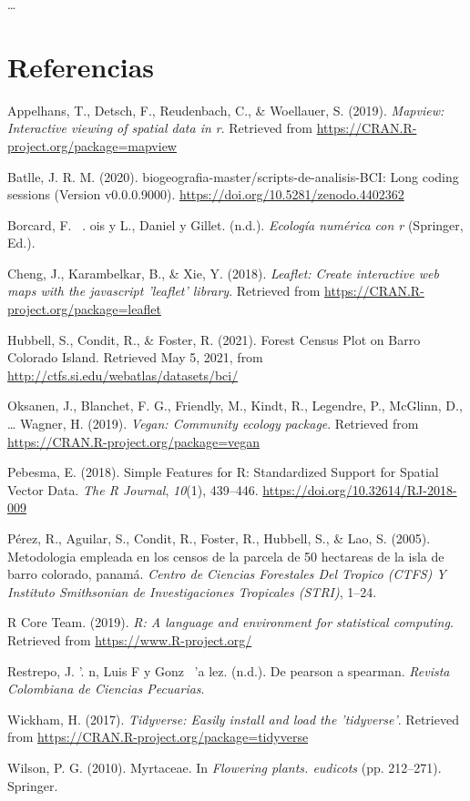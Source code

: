 \documentclass[11pt,]{article}
\begin{document}
\ldots

\section*{Referencias}\label{referencias}

\hypertarget{refs}{}
\hypertarget{ref-mapview}{}
Appelhans, T., Detsch, F., Reudenbach, C., \& Woellauer, S. (2019).
\emph{Mapview: Interactive viewing of spatial data in r}. Retrieved from
\url{https://CRAN.R-project.org/package=mapview}

\hypertarget{ref-jose_ramon_martinez_batlle_2020_4402362}{}
Batlle, J. R. M. (2020). biogeografia-master/scripts-de-analisis-BCI:
Long coding sessions (Version v0.0.0.9000).
\url{https://doi.org/10.5281/zenodo.4402362}

\hypertarget{ref-borcard2018numerical}{}
Borcard, F. ~. ois y L., Daniel y Gillet. (n.d.). \emph{Ecología
numérica con r} (Springer, Ed.).

\hypertarget{ref-leaflet}{}
Cheng, J., Karambelkar, B., \& Xie, Y. (2018). \emph{Leaflet: Create
interactive web maps with the javascript 'leaflet' library}. Retrieved
from \url{https://CRAN.R-project.org/package=leaflet}

\hypertarget{ref-webcenso}{}
Hubbell, S., Condit, R., \& Foster, R. (2021). Forest Census Plot on
Barro Colorado Island. Retrieved May 5, 2021, from
\url{http://ctfs.si.edu/webatlas/datasets/bci/}

\hypertarget{ref-vegan}{}
Oksanen, J., Blanchet, F. G., Friendly, M., Kindt, R., Legendre, P.,
McGlinn, D., \ldots{} Wagner, H. (2019). \emph{Vegan: Community ecology
package}. Retrieved from \url{https://CRAN.R-project.org/package=vegan}

\hypertarget{ref-sf}{}
Pebesma, E. (2018). Simple Features for R: Standardized Support for
Spatial Vector Data. \emph{The R Journal}, \emph{10}(1), 439--446.
\url{https://doi.org/10.32614/RJ-2018-009}

\hypertarget{ref-perez2005metodologia}{}
Pérez, R., Aguilar, S., Condit, R., Foster, R., Hubbell, S., \& Lao, S.
(2005). Metodologia empleada en los censos de la parcela de 50 hectareas
de la isla de barro colorado, panamá. \emph{Centro de Ciencias
Forestales Del Tropico (CTFS) Y Instituto Smithsonian de Investigaciones
Tropicales (STRI)}, 1--24.

\hypertarget{ref-citadeR}{}
R Core Team. (2019). \emph{R: A language and environment for statistical
computing}. Retrieved from \url{https://www.R-project.org/}

\hypertarget{ref-restrepo2007pearson}{}
Restrepo, J. '. n, Luis F y Gonz ~'a lez. (n.d.). De pearson a spearman.
\emph{Revista Colombiana de Ciencias Pecuarias}.

\hypertarget{ref-tidyverse}{}
Wickham, H. (2017). \emph{Tidyverse: Easily install and load the
'tidyverse'}. Retrieved from
\url{https://CRAN.R-project.org/package=tidyverse}

\hypertarget{ref-wilson2010myrtaceae}{}
Wilson, P. G. (2010). Myrtaceae. In \emph{Flowering plants. eudicots}
(pp. 212--271). Springer.




\newpage
\singlespacing 
\end{document}
